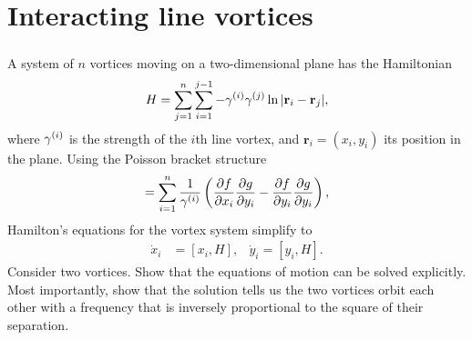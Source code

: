 \documentclass[11pt]{article}
\renewcommand{\vec}[1]{\mathbf{#1}}
\newcommand{\beq}{\begin{equation*}}
\newcommand{\eeq}{\end{equation*}}
\newenvironment{statement}[1]
{
	\section{#1}
	\color{darkgray}
	\ignorespaces
}
{
}
\begin{document}









\newcommand{\gami}{\gam^{(i)}}
\newcommand{\gamj}{\gam^{(j)}}
\newcommand{\vr}{\vec{r}}
\newcommand{\vri}{\vr_i}
\newcommand{\vrj}{\vr_j}
\renewcommand{\xi}{x_i}
\newcommand{\yi}{y_i}
\newcommand{\xj}{x_j}
\newcommand{\yj}{y_j}

\newcommand{\xd}{\dot{x}}
\newcommand{\yd}{\dot{y}}
\newcommand{\xdi}{\xd_i}
\newcommand{\ydi}{\yd_i}

\newcommand{\gamq}{\gam^{(1)}}
\newcommand{\gamw}{\gam^{(2)}}
\newcommand{\vrq}{\vr_1}
\newcommand{\vrw}{\vr_2}

\newcommand{\yq}{y_1}
\newcommand{\xw}{x_2}
\newcommand{\yw}{y_2}

\newcommand{\xdq}{\xd_1}
\newcommand{\ydq}{\yd_1}
\newcommand{\xdw}{\xd_2}
\newcommand{\ydw}{\yd_2}

\begin{statement}{Interacting line vortices} \label{vort1}
\subparagraph{}
	A system of $n$ vortices moving on a two-dimensional plane has the Hamiltonian
	\beq
		H = \sum_{j = 1}^n \sum_{i = 1}^{j - 1} -\gami \gamj \ln|\vri - \vrj|,
	\eeq
	where $\gami$ is the strength of the $i$th line vortex, and $\vri = (\xi, \yi)$ its position in the plane.  Using the Poisson bracket structure
	\beq
		[f, g] = \sum_{i = 1}^n \frac{1}{\gami} \left( \pdv{f}{\xi} \pdv{g}{\yi} - \pdv{f}{\yi} \pdv{g}{\yi} \right),
	\eeq
	Hamilton's equations for the vortex system simplify to
	\begin{align*}
		\xdi &= [\xi, H], &
		\ydi = [\yi, H].
	\end{align*}
	Consider two vortices.  Show that the equations of motion can be solved explicitly.  Most importantly, show that the solution tells us the two vortices orbit each other with a frequency that is inversely proportional to the square of their separation.
\end{statement}
\end{document}
